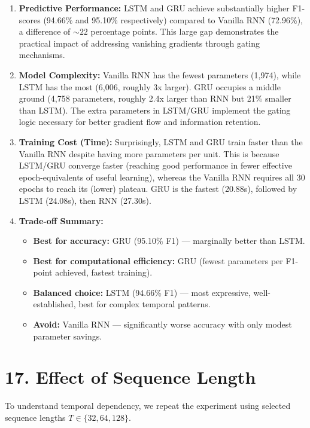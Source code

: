 \documentclass[10pt]{article}
\begin{document}
\begin{enumerate}
\item \textbf{Predictive Performance:} LSTM and GRU achieve substantially higher F1-scores (94.66\% and 
95.10\% respectively) compared to Vanilla RNN (72.96\%), a difference of $\sim 22$ percentage points. 
This large gap demonstrates the practical impact of addressing vanishing gradients through gating mechanisms.

\item \textbf{Model Complexity:} Vanilla RNN has the fewest parameters (1,974), while LSTM has the most 
(6,006, roughly 3x larger). GRU occupies a middle ground (4,758 parameters, roughly 2.4x larger than RNN 
but 21\% smaller than LSTM). The extra parameters in LSTM/GRU implement the gating logic necessary for 
better gradient flow and information retention.

\item \textbf{Training Cost (Time):} Surprisingly, LSTM and GRU train faster than the Vanilla RNN despite 
having more parameters per unit. This is because LSTM/GRU converge faster (reaching good performance in 
fewer effective epoch-equivalents of useful learning), whereas the Vanilla RNN requires all 30 epochs to 
reach its (lower) plateau. GRU is the fastest (20.88s), followed by LSTM (24.08s), then RNN (27.30s).

\item \textbf{Trade-off Summary:} 
  \begin{itemize}
  \item \textbf{Best for accuracy:} GRU (95.10\% F1) — marginally better than LSTM.
  \item \textbf{Best for computational efficiency:} GRU (fewest parameters per F1-point achieved, fastest training).
  \item \textbf{Balanced choice:} LSTM (94.66\% F1) — most expressive, well-established, best for complex temporal patterns.
  \item \textbf{Avoid:} Vanilla RNN — significantly worse accuracy with only modest parameter savings.
  \end{itemize}
\end{enumerate}

\section*{17. Effect of Sequence Length}

To understand temporal dependency, we repeat the experiment using selected sequence lengths 
$T \in \{32, 64, 128\}$.
\end{document}
